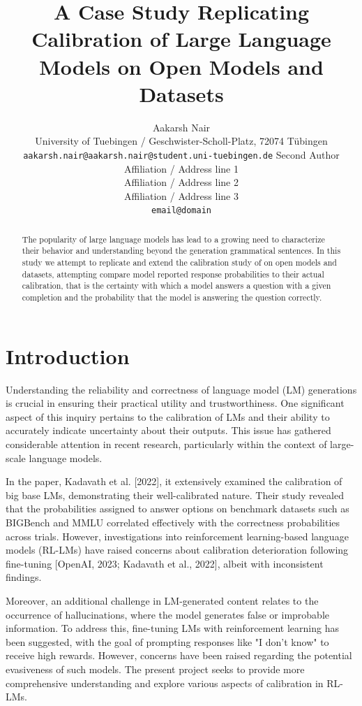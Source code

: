 \documentclass[11pt]{article}
\title{A Case Study Replicating Calibration of Large Language Models on Open Models and Datasets}
\author{Aakarsh Nair\\
  University of Tuebingen / Geschwister-Scholl-Platz, 72074 Tübingen\\
  \texttt{aakarsh.nair@aakarsh.nair@student.uni-tuebingen.de} 
  Second Author \\
  Affiliation / Address line 1 \\
  Affiliation / Address line 2 \\
  Affiliation / Address line 3 \\
  \texttt{email@domain} \\}
\begin{document}
\maketitle

\begin{abstract}
  The popularity of large language models has lead to a growing 
need to characterize their behavior and understanding 
beyond the generation grammatical sentences. In this study we 
attempt to replicate and extend the calibration study of 
\cite{kadavath2022language} on open models and datasets, 
attempting compare model reported response probabilities to 
their actual calibration, that is the certainty with which a model answers 
a question with a given completion and the probability that the 
model is answering the question correctly. 
\end{abstract}

\section{Introduction}
Understanding the reliability and correctness of language model (LM) generations is crucial in ensuring their practical utility and trustworthiness. One significant aspect of this inquiry pertains to the calibration of LMs and their ability to accurately indicate uncertainty about their outputs. This issue has gathered considerable attention in recent research, particularly within the context of large-scale language models.

In the paper, Kadavath et al. [2022], it extensively examined the calibration of big base LMs, demonstrating their well-calibrated nature. Their study revealed that the probabilities assigned to answer options on benchmark datasets such as BIGBench and MMLU correlated effectively with the correctness probabilities across trials. However, investigations into reinforcement learning-based language models (RL-LMs) have raised concerns about calibration deterioration following fine-tuning [OpenAI, 2023; Kadavath et al., 2022], albeit with inconsistent findings.

Moreover, an additional challenge in LM-generated content relates to the occurrence of hallucinations, where the model generates false or improbable information. To address this, fine-tuning LMs with reinforcement learning has been suggested, with the goal of prompting responses like "I don't know" to receive high rewards. However, concerns have been raised regarding the potential evasiveness of such models. The present project seeks to provide more comprehensive understanding and explore various aspects of calibration in RL-LMs.
\end{document}
